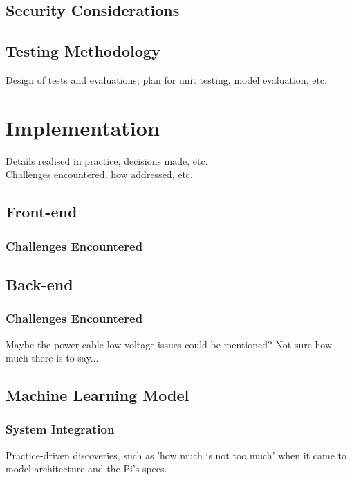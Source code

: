     \subsection{Security Considerations}

    \subsection{Testing Methodology}
        Design of tests and evaluations; plan for unit testing, model evaluation, etc.


\section{Implementation}
    Details realised in practice, decisions made, etc.\\
    Challenges encountered, how addressed, etc.
    \subsection{Front-end}
        \subsubsection{Challenges Encountered}

    \subsection{Back-end}
        \subsubsection{Challenges Encountered}
            Maybe the power-cable low-voltage issues could be mentioned? Not sure how much there is to say...

    \subsection{Machine Learning Model}
        \subsubsection{System Integration}
            Practice-driven discoveries, such as 'how much is not too much' when it came to model architecture and the Pi's specs.


